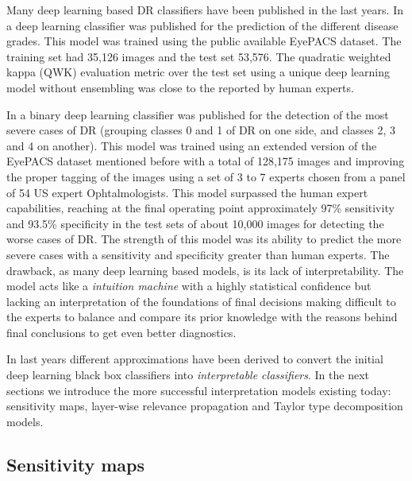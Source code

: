 \documentclass[review]{elsarticle}
\theoremstyle{definition} %
\theoremstyle{remark}
\begin{document}
Many deep learning based DR classifiers have been published in the last years. In \cite{DELATORRE2017} a deep learning classifier was published for the prediction of the different disease grades. This model was trained using the public available EyePACS dataset. The training set had 35,126 images and the test set 53,576. The quadratic weighted kappa (QWK) evaluation metric \cite{cohen1968weighted} over the test set using a unique deep learning model without ensembling was close to the reported by human experts. 

In \cite{doi:10.1001/jama.2016.17216} a binary deep learning classifier was published for the detection of the most severe cases of DR (grouping classes 0 and 1 of DR on one side, and classes 2, 3 and 4 on another). This model was trained using an extended version of the EyePACS dataset mentioned before with a total of 128,175 images and improving the proper tagging of the images using a set of 3 to 7 experts chosen from a panel of 54 US expert Ophtalmologists. This model surpassed the human expert capabilities, reaching at the final operating point approximately  97\% sensitivity and 93.5\% specificity in the test sets of about 10,000 images for detecting the worse cases of DR. The strength of this model was its ability to predict the more severe cases with a sensitivity and specificity greater than human experts. The drawback, as many deep learning based models, is its lack of interpretability. The model acts like a \emph{intuition machine} with a highly statistical confidence but lacking an interpretation of the foundations of final decisions making difficult to the experts to balance and compare its prior knowledge with the reasons behind final conclusions to get even better diagnostics.

In last years different approximations have been derived to convert the initial deep learning black box classifiers into \emph{interpretable classifiers}. In the next sections we introduce the more successful interpretation models existing today: sensitivity maps, layer-wise relevance propagation and Taylor type decomposition models. 

\subsection{Sensitivity maps}
\end{document}
